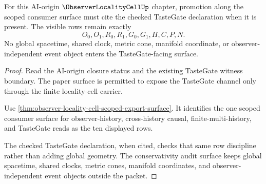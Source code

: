\begin{theorem}
\label{thm:observer-locality-cell-tastegate-cited-readiness}
For this AI-origin $\ObserverLocalityCellUp$ chapter, promotion along the scoped consumer surface must cite the checked TasteGate declaration when it is present. The visible rows remain exactly
$$
O_0,O_1,R_0,R_1,G_0,G_1,H,C,P,N.
$$
No global spacetime, shared clock, metric cone, manifold coordinate, or observer-independent event object enters the TasteGate-facing surface.
\end{theorem}
\begin{proof}
Read the AI-origin closure status and the existing TasteGate witness boundary. The paper surface is permitted to expose the TasteGate channel only through the finite locality-cell carrier.

Use \autoref{thm:observer-locality-cell-scoped-export-surface}. It identifies the one scoped consumer surface for observer-history, cross-history causal, finite-multi-history, and TasteGate reads as the ten displayed rows.

The checked TasteGate declaration, when cited, checks that same row discipline rather than adding global geometry. The conservativity audit surface keeps global spacetime, shared clocks, metric cones, manifold coordinates, and observer-independent event objects outside the packet.
\end{proof}

